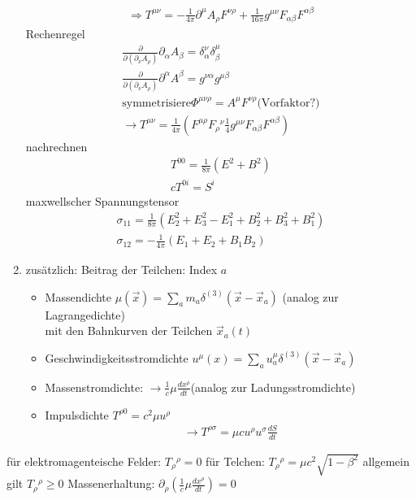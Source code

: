 \documentclass[a4paper]{article}
\begin{document}
\begin{enumerate}
\begin{align}
  \Rightarrow T^{\mu\nu}=-\frac{1}{4\pi}\partial^\mu A_\rho
  F^{\nu\rho}+\frac{1}{16\pi} g^{\mu\nu} F_{\alpha\beta}F^{\alpha\beta}
  \end{align}
  Rechenregel \begin{align}
  \frac{\partial}{\partial(\partial_\nu A_\rho)}\partial_\alpha A_\beta
  =\delta^\nu_\alpha\delta^\mu_\beta\\
  \frac{\partial}{\partial(\partial_\nu A_\rho)}\partial^\alpha A^\beta
  =g^{\nu\alpha}g^{\mu\beta}\\
  \text{symmetrisiere} \Phi^{\mu\nu\rho}=A^\mu F^{\nu\rho} \text{
  (Vorfaktor?)}\\
  \rightarrow T^{\mu\nu}=\frac{1}{4\pi}\left(
  F^{\mu\rho}F_{\rho}{}^{\nu} \frac{1}{4} g^{\mu\nu}
  F_{\alpha\beta}F^{\alpha\beta}\right)
  \end{align}
  nachrechnen
  \begin{align}
  T^{00}=\frac{1}{8\pi}(E^2+B^2)\\
  cT^{0i}=S^i
  \end{align}
  maxwellscher Spannungstensor
  \begin{align}
  \sigma_{11}=\frac{1}{8\pi}\left( E_2^2+E_3^2-E_1^2+B^2_2+B^2_3+B^2_1 \right)\\
  \sigma_{12}=-\frac{1}{4\pi}\left( E_1+E_2+B_1B_2 \right)
  \end{align}
  \item zusätzlich: Beitrag der Teilchen: Index $a$\\
  \begin{itemize}
  \item Massendichte $\mu(\vec{x})=\sum_am_a\delta^{(3)}(\vec{x}-\vec{x}_a)$
  	(analog zur Lagrangedichte)\\
  	mit den Bahnkurven der Teilchen $\vec{x}_a(t)$\\
  \item Geschwindigkeitsstromdichte 
  	$u^\mu(x)=\sum_a u^\mu_a \delta^{(3)}(\vec{x}-\vec{x}_a)$
  \item Massenstromdichte: $\rightarrow \frac{1}{c}\mu\frac{dx^\rho}{dt}$(analog zur
  	Ladungsstromdichte)\\
  \item Impulsdichte $T^{\rho0}=c^2\mu u^\rho$\\ \begin{align}
  	\rightarrow T^{\rho\sigma}=\mu c u^\rho u^\sigma \frac{dS}{dt}
  	\end{align} 
  \end{itemize}
\end{enumerate}
für elektromagenteische Felder: $T_\rho{}^\rho=0$
für Telchen: $T_\rho{}^\rho=\mu c^2\sqrt{1-\beta^2}$
allgemein gilt $T_\rho{}^\rho\geq0$
Massenerhaltung: $\partial_\rho\left( \frac{1}{c}\mu \frac{dx^\rho}{dt}
\right)=0$
\end{document}
